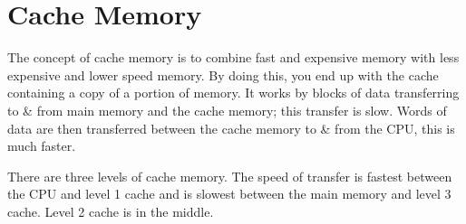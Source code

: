 \section*{Cache Memory}
The concept of cache memory is to combine fast and expensive memory with less expensive and lower speed memory. By doing this, you end up with the cache containing a copy of a portion of memory. It works by blocks of data transferring to \& from main memory and the cache memory; this transfer is slow. Words of data are then transferred between the cache memory to \& from the CPU, this is much faster. 

There are three levels of cache memory. The speed of transfer is fastest between the CPU and level 1 cache and is slowest between the main memory and level 3 cache. Level 2 cache is in the middle. 